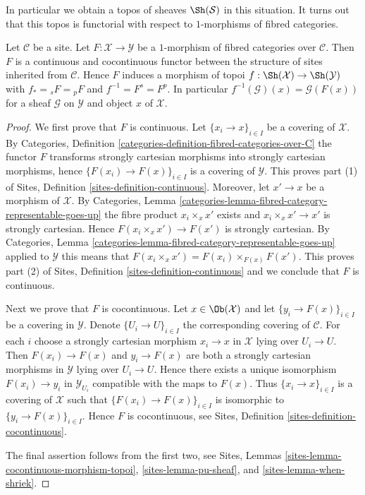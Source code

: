 \noindent
In particular we obtain a topos of sheaves $\Sh(\mathcal{S})$
in this situation. It turns out that this topos is functorial with respect
to $1$-morphisms of fibred categories.

\begin{lemma}
\label{lemma-topology-inherited-functorial}
Let $\mathcal{C}$ be a site. Let $F : \mathcal{X} \to \mathcal{Y}$
be a $1$-morphism of fibred categories over $\mathcal{C}$.
Then $F$ is a continuous and cocontinuous functor between the structure
of sites inherited from $\mathcal{C}$. Hence $F$ induces a morphism of topoi
$f : \Sh(\mathcal{X}) \to \Sh(\mathcal{Y})$ with
$f_* = {}_sF = {}_pF$ and $f^{-1} = F^s = F^p$. In particular
$f^{-1}(\mathcal{G})(x) = \mathcal{G}(F(x))$
for a sheaf $\mathcal{G}$ on $\mathcal{Y}$ and object $x$ of $\mathcal{X}$.
\end{lemma}

\begin{proof}
We first prove that $F$ is continuous.
Let $\{x_i \to x\}_{i \in I}$ be a covering of $\mathcal{X}$. By
Categories, Definition \ref{categories-definition-fibred-categories-over-C}
the functor $F$ transforms strongly cartesian morphisms into strongly
cartesian morphisms, hence $\{F(x_i) \to F(x)\}_{i \in I}$ is a covering
of $\mathcal{Y}$. This proves part (1) of
Sites, Definition \ref{sites-definition-continuous}.
Moreover, let $x' \to x$ be a morphism of $\mathcal{X}$. By
Categories, Lemma \ref{categories-lemma-fibred-category-representable-goes-up}
the fibre product $x_i \times_x x'$ exists and $x_i \times_x x' \to x'$
is strongly cartesian. Hence $F(x_i \times_x x') \to F(x')$ is strongly
cartesian. By
Categories, Lemma \ref{categories-lemma-fibred-category-representable-goes-up}
applied to $\mathcal{Y}$ this means that
$F(x_i \times_x x') = F(x_i) \times_{F(x)} F(x')$.
This proves part (2) of
Sites, Definition \ref{sites-definition-continuous}
and we conclude that $F$ is continuous.

\medskip\noindent
Next we prove that $F$ is cocontinuous.
Let $x \in \Ob(\mathcal{X})$ and let $\{y_i \to F(x)\}_{i \in I}$
be a covering in $\mathcal{Y}$. Denote $\{U_i \to U\}_{i \in I}$ the
corresponding covering of $\mathcal{C}$. For each $i$ choose a strongly
cartesian morphism $x_i \to x$ in $\mathcal{X}$ lying over $U_i \to U$.
Then $F(x_i) \to F(x)$ and $y_i \to F(x)$ are both a strongly cartesian
morphisms in $\mathcal{Y}$ lying over $U_i \to U$. Hence there exists
a unique isomorphism $F(x_i) \to y_i$ in $\mathcal{Y}_{U_i}$ compatible
with the maps to $F(x)$. Thus $\{x_i \to x\}_{i \in I}$ is a covering of
$\mathcal{X}$ such that $\{F(x_i) \to F(x)\}_{i \in I}$ is isomorphic to
$\{y_i \to F(x)\}_{i \in I}$. Hence $F$ is cocontinuous, see
Sites, Definition \ref{sites-definition-cocontinuous}.

\medskip\noindent
The final assertion follows from the first two, see
Sites, Lemmas
\ref{sites-lemma-cocontinuous-morphism-topoi},
\ref{sites-lemma-pu-sheaf}, and
\ref{sites-lemma-when-shriek}.
\end{proof}

